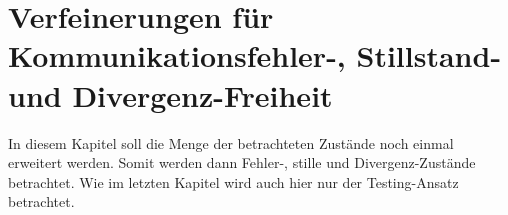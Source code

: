 \chapter{Verfeinerungen für Kommunikationsfehler-, Stillstand- und
Divergenz-Freiheit}

In diesem Kapitel soll die Menge der betrachteten Zustände noch einmal
erweitert werden. Somit werden dann Fehler-, stille und Divergenz-Zustände
betrachtet. Wie im letzten Kapitel wird auch hier nur der Testing-Ansatz
betrachtet.




